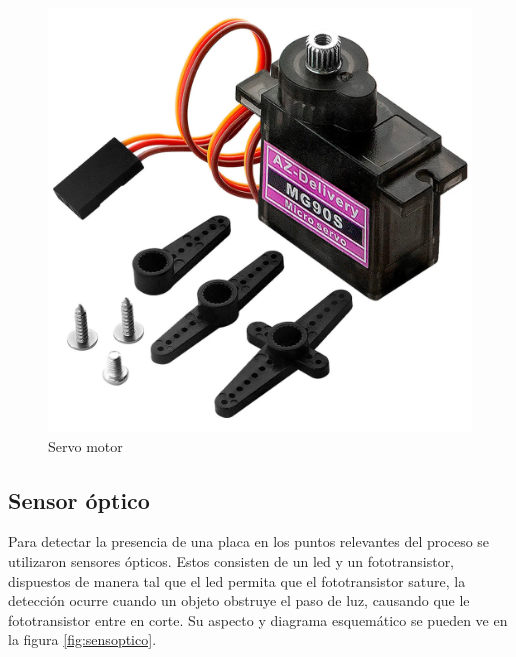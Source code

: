 \documentclass[12pt,letterpaper]{article}     %
\begin{document}
\begin{figure}[!ht]
\centering
\includegraphics[scale=0.15]{imagenes/servo.jpg}
\caption{Servo motor}
\label{fig:servo}
\end{figure}

\subsection{Sensor óptico}

Para detectar la presencia de una placa en los puntos relevantes del proceso se utilizaron sensores ópticos.
Estos consisten de un led y un fototransistor, dispuestos de manera tal que el led permita que el fototransistor
sature, la detección ocurre cuando un objeto obstruye el paso de luz, causando que le fototransistor entre en
corte. Su aspecto y diagrama esquemático se pueden ve en la figura \ref{fig:sensoptico}.
\end{document}
